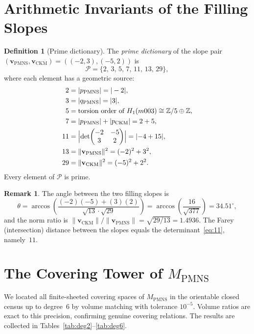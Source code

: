 \documentclass[12pt]{article}
\theoremstyle{definition}
\newtheorem{definition}[theorem]{Definition}
\newtheorem{remark}[theorem]{Remark}
\begin{document}
\section{Arithmetic Invariants of the Filling Slopes}
\label{sec:arithmetic}

\begin{definition}[Prime dictionary]
\label{def:dict}
The \emph{prime dictionary} of the slope pair
$(\mathbf{v}_{\mathrm{PMNS}}, \mathbf{v}_{\mathrm{CKM}}) =
((-2,3),(-5,2))$ is
\[
  \mathcal{P} = \{2,\,3,\,5,\,7,\,11,\,13,\,29\},
\]
where each element has a geometric source:
\begin{align}
  2  &= |p_{\mathrm{PMNS}}| = |-2|, \label{eq:2}\\
  3  &= |q_{\mathrm{PMNS}}| = |3|,  \label{eq:3}\\
  5  &= \text{torsion order of }
       H_1(m003) \cong \mathbb{Z}/5 \oplus \mathbb{Z}, \label{eq:5}\\
  7  &= |p_{\mathrm{PMNS}}| + |p_{\mathrm{CKM}}| = 2 + 5, \label{eq:7}\\
  11 &= \Bigl|\det\!\begin{pmatrix}-2&-5\\3&2\end{pmatrix}\Bigr|
       = |{-4+15}|, \label{eq:11}\\
  13 &= \|\mathbf{v}_{\mathrm{PMNS}}\|^2 = (-2)^2+3^2, \label{eq:13}\\
  29 &= \|\mathbf{v}_{\mathrm{CKM}}\|^2  = (-5)^2+2^2. \label{eq:29}
\end{align}
Every element of $\mathcal{P}$ is prime.
\end{definition}

\begin{remark}
The angle between the two filling slopes is
\[
  \theta
  = \arccos\!\left(
      \frac{(-2)(-5)+(3)(2)}{\sqrt{13}\cdot\sqrt{29}}
    \right)
  = \arccos\!\left(\frac{16}{\sqrt{377}}\right)
  = 34.51^\circ,
\]
and the norm ratio is
$\|\mathbf{v}_{\mathrm{CKM}}\|/\|\mathbf{v}_{\mathrm{PMNS}}\|
= \sqrt{29/13} = 1.4936$.
The Farey (intersection) distance between the slopes equals the
determinant~\eqref{eq:11}, namely~$11$.
\end{remark}

\section{The Covering Tower of $M_{\mathrm{PMNS}}$}
\label{sec:tower}

We located all finite-sheeted covering spaces of $M_{\mathrm{PMNS}}$
in the orientable closed census up to degree~6 by volume matching with
tolerance $10^{-5}$. Volume ratios are exact to this precision,
confirming genuine covering relations. The results are collected in
Tables~\ref{tab:deg2}--\ref{tab:deg6}.
\end{document}
